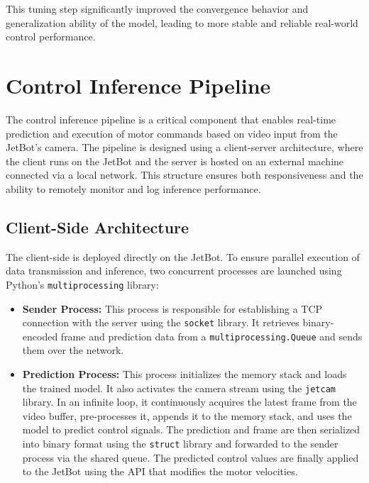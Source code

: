 This tuning step significantly improved the convergence behavior and generalization ability of the model, leading to more stable and reliable real-world control performance.

\section{Control Inference Pipeline}
\label{sec:pipeline}

The control inference pipeline is a critical component that enables real-time prediction and execution of motor commands based on video input from the JetBot's camera. The pipeline is designed using a client-server architecture, where the client runs on the JetBot and the server is hosted on an external machine connected via a local network. This structure ensures both responsiveness and the ability to remotely monitor and log inference performance.

\subsection{Client-Side Architecture}

The client-side is deployed directly on the JetBot. To ensure parallel execution of data transmission and inference, two concurrent processes are launched using Python's \texttt{multiprocessing} library:

\begin{itemize}
  \item \textbf{Sender Process:} This process is responsible for establishing a TCP connection with the server using the \texttt{socket} library. It retrieves binary-encoded frame and prediction data from a \texttt{multiprocessing.Queue} and sends them over the network.

  \item \textbf{Prediction Process:} This process initializes the memory stack and loads the trained model. It also activates the camera stream using the \texttt{jetcam} library. In an infinite loop, it continuously acquires the latest frame from the video buffer, pre-processes it, appends it to the memory stack, and uses the model to predict control signals. The prediction and frame are then serialized into binary format using the \texttt{struct} library and forwarded to the sender process via the shared queue. The predicted control values are finally applied to the JetBot using the API that modifies the motor velocities.
\end{itemize}

